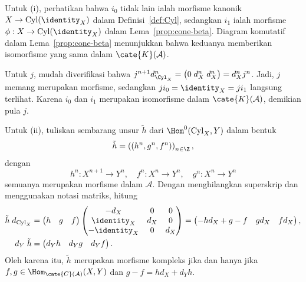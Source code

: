\begin{bukti}
	Untuk (i), perhatikan bahwa $i_0$ tidak lain ialah morfisme kanonik
	$X\to\mathrm{Cyl}(\identity_X)$ dalam Definisi~\ref{def:Cyl}, sedangkan
	$i_1$ ialah morfisme $\phi:X\to\mathrm{Cyl}(\identity_X)$ dalam
	Lema~\ref{prop:cone-beta}. Diagram komutatif dalam
	Lema~\ref{prop:cone-beta} menunjukkan bahwa keduanya memberikan
	isomorfisme yang sama dalam $\cate{K}(\mathcal{A})$.

	Untuk $j$, mudah diverifikasi bahwa
	$j^{n+1}d_{\Cyl_X}^n=\bigl(0\;d_X^n\;d_X^n\bigr)=d_X^nj^n$.
	Jadi, $j$ memang merupakan morfisme, sedangkan
	$ji_0=\identity_X=ji_1$ langsung terlihat. Karena $i_0$ dan $i_1$
	merupakan isomorfisme dalam $\cate{K}(\mathcal{A})$, demikian pula $j$.

	Untuk (ii), tuliskan sembarang unsur $\tilde{h}$ dari
	$\Hom^0(\mathrm{Cyl}_X,Y)$ dalam bentuk
	\[
		\tilde{h}=\left((h^n,g^n,f^n)\right)_{n\in\Z},
	\]
	dengan
	\[ h^n: X^{n+1} \to Y^n, \quad f^n: X^n \to Y^n, \quad g^n: X^n \to Y^n \]
	semuanya merupakan morfisme dalam $\mathcal{A}$. Dengan menghilangkan
	superskrip dan menggunakan notasi matriks, hitung
	\begin{align*}
		\tilde{h} \; d_{\mathrm{Cyl}_X} & = \begin{pmatrix} h & g & f \end{pmatrix} \begin{pmatrix} -d_X & 0 & 0 \\ \identity_X & d_X & 0 \\ -\identity_X & 0 & d_X \end{pmatrix} = \begin{pmatrix} -hd_X + g - f & g d_X & f d_X \end{pmatrix} , \\
		d_Y \; \tilde{h} & = \begin{pmatrix} d_Y h & d_Y g & d_Y f \end{pmatrix}.
	\end{align*}
	Oleh karena itu, $\tilde{h}$ merupakan morfisme kompleks jika dan hanya
	jika $f,g\in\Hom_{\cate{C}(\mathcal{A})}(X,Y)$ dan
	$g-f=hd_X+d_Yh$.
\end{bukti}

